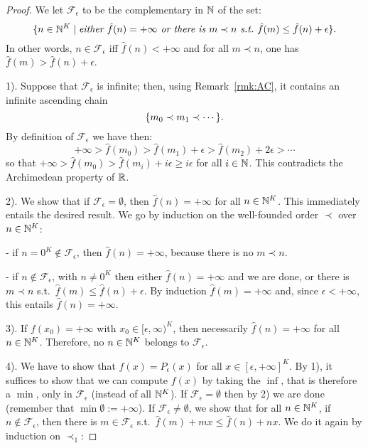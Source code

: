 \begin{proof}
We let $\mathcal F_\epsilon$ to be the complementary in $\mathbb{N}$ of the set:
\[
 \{ n  \in\mathbb{N}^{K} \mid \textit{either } \hat f ( n  )=+\infty \textit{ or there is }  m  \prec  n  \textit{ s.t.\ } \hat f( m  )\leq\hat f( n  )+\epsilon\}.
\]
In other words, $ n  \in\mathcal F_\epsilon$ iff $\hat f( n  )<+\infty$ and for all $ m  \prec  n  $, one has $\hat f( m  )>\hat f( n  )+\epsilon$.

1).
Suppose that $\mathcal F_\epsilon$ is infinite; then, using Remark~\ref{rmk:AC}, it contains an infinite ascending chain
\[\{ m  _0\prec  m  _1\prec\cdots\}.\]
By definition of $\mathcal F_\epsilon$ we have then:
\[+\infty>\hat f( m  _0)>\hat f( m  _1)+\epsilon>\hat f( m  _2)+2\epsilon>\cdots\]
so that $+\infty>\hat f( m  _0)>\hat f( m  _{i})+i\epsilon\geq i\epsilon$ for all $i\in\mathbb{N}$.
This contradicts the Archimedean property of $\mathbb{R}$.

2).
We show that if $\mathcal F_\epsilon=\emptyset$, then $\hat f( n  )=+\infty$ for all $ n  \in\mathbb{N}^{K}$.
This immediately entails the desired result.
We go by induction on the well-founded order $\prec$ over $ n  \in\mathbb{N}^{K}$:

- if $ n  =0^{K}\notin\mathcal F_\epsilon$, then $\hat f( n  )=+\infty$, because there is no $ m  \prec n  $.

- if $ n  \notin\mathcal F_\epsilon$, with $ n  \neq 0^{K}$ then either $\hat f( n  )=+\infty$ and we are done, or there is $ m  \prec  n  $ s.t.\ $\hat f( m  )\leq \hat f( n  )+\epsilon$.
By induction $\hat f( m  )=+\infty$ and, since $\epsilon<+\infty$, this entails $\hat f( n  )=+\infty$.

3).
If $f( x _0)=+\infty$ with $ x _0\in [\epsilon,\infty)^{K}$, then necessarily $\hat f( n  )=+\infty$ for all $ n  \in\mathbb{N}^{K}$.
Therefore, no $ n  \in\mathbb{N}^{K}$ belongs to $\mathcal F_\epsilon$.

4).
We have to show that $f( x )=P_\epsilon( x )$ for all $ x \in [\epsilon,+\infty]^{K}$.
By 1), it suffices to show that we can compute $f( x )$ by taking the $\inf$, that is therefore a $\min$, only in $\mathcal F_\epsilon$ (instead of all $\mathbb{N}^{K}$).
If $\mathcal F_\epsilon=\emptyset$ then by 2) we are done (remember that $\min\emptyset := +\infty$).
If $\mathcal F_\epsilon\neq\emptyset$, we show that for all $ n  \in\mathbb{N}^{K}$, if $ n   \notin\mathcal F_\epsilon$, then there is $ m  \in\mathcal F_\epsilon$ s.t.\ $\hat f( m  )+ m   x  \leq \hat f( n  )+ n   x $.
We do it again by induction on $\prec_{1}$:


\end{proof}
